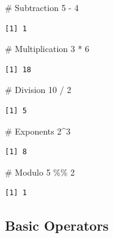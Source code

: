 \documentclass[
  letterpaper,
  DIV=11,
  numbers=noendperiod]{scrreprt}
\newenvironment{Shaded}{\begin{snugshade}}{\end{snugshade}}
\newcommand{\CommentTok}[1]{\textcolor[rgb]{0.37,0.37,0.37}{#1}}
\newcommand{\DecValTok}[1]{\textcolor[rgb]{0.68,0.00,0.00}{#1}}
\newcommand{\SpecialCharTok}[1]{\textcolor[rgb]{0.37,0.37,0.37}{#1}}
\begin{document}
\begin{Shaded}
\begin{Highlighting}[]
\CommentTok{\# Subtraction}
\DecValTok{5} \SpecialCharTok{{-}} \DecValTok{4}
\end{Highlighting}
\end{Shaded}

\begin{verbatim}
[1] 1
\end{verbatim}

\begin{Shaded}
\begin{Highlighting}[]
\CommentTok{\# Multiplication}
\DecValTok{3} \SpecialCharTok{*} \DecValTok{6}
\end{Highlighting}
\end{Shaded}

\begin{verbatim}
[1] 18
\end{verbatim}

\begin{Shaded}
\begin{Highlighting}[]
\CommentTok{\# Division}
\DecValTok{10} \SpecialCharTok{/} \DecValTok{2}
\end{Highlighting}
\end{Shaded}

\begin{verbatim}
[1] 5
\end{verbatim}

\begin{Shaded}
\begin{Highlighting}[]
\CommentTok{\# Exponents}
\DecValTok{2}\SpecialCharTok{\^{}}\DecValTok{3}
\end{Highlighting}
\end{Shaded}

\begin{verbatim}
[1] 8
\end{verbatim}

\begin{Shaded}
\begin{Highlighting}[]
\CommentTok{\# Modulo}
\DecValTok{5} \SpecialCharTok{\%\%} \DecValTok{2}
\end{Highlighting}
\end{Shaded}

\begin{verbatim}
[1] 1
\end{verbatim}

\subsection{Basic Operators}\label{basic-operators}
\end{document}
